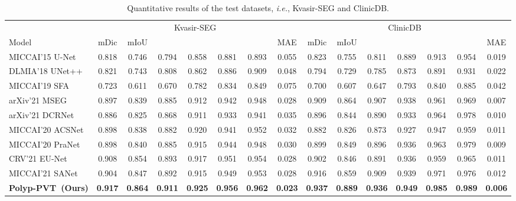 \documentclass[journal]{IEEEtran}
\def\ourmodel{Polyp-PVT}
\begin{document}
\begin{table*}[t!]
\small
\centering
	\caption{Quantitative results of the test datasets, \emph{i.e.}, Kvasir-SEG and ClinicDB.
	}
	\vspace{-5pt}
	\renewcommand{\arraystretch}{1.0}
	\setlength\tabcolsep{4.0pt}
    \begin{tabular}{l|ccccccc|ccccccc}
    \hline  
          & \multicolumn{7}{c|}{Kvasir-SEG~\cite{jha2020kvasir}}                                  & \multicolumn{7}{c}{ClinicDB~\cite{bernal2015wm}} \\
\cline{2-15} 
Model & mDic& mIoU &    &     &    &   & MAE & mDic & mIoU &    &     &  &   & MAE   \\
    \hline
    MICCAI'15 U-Net  & 0.818  & 0.746  & 0.794  & 0.858  & 0.881    & 0.893 & 0.055  & 0.823  & 0.755  & 0.811  & 0.889  & 0.913    & 0.954 & 0.019    \\
    DLMIA'18 UNet++  & 0.821  & 0.743  & 0.808  & 0.862  & 0.886    & 0.909  & 0.048  & 0.794  & 0.729  & 0.785  & 0.873  & 0.891   & 0.931 & 0.022    \\
    MICCAI'19 SFA     & 0.723  & 0.611  & 0.670  & 0.782  & 0.834    & 0.849& 0.075  & 0.700  & 0.607  & 0.647  & 0.793  & 0.840   & 0.885  & 0.042  \\
    arXiv'21 MSEG & 0.897  & 0.839  & 0.885  & 0.912  & 0.942   & 0.948  & 0.028   & 0.909  & 0.864  & 0.907  & 0.938  & 0.961    & 0.969 & 0.007    \\
arXiv'21 DCRNet  & 0.886  & 0.825  & 0.868  & 0.911  & 0.933   & 0.941 & 0.035  & 0.896  & 0.844  & 0.890  & 0.933  & 0.964   & 0.978 & 0.010   \\
    MICCAI'20 ACSNet  & 0.898  & 0.838  & 0.882  & 0.920  & 0.941   & 0.952   & 0.032   & 0.882  & 0.826  & 0.873  & 0.927  & 0.947   & 0.959 & 0.011   \\
    MICCAI'20 PraNet  & 0.898  & 0.840  & 0.885  & 0.915  & 0.944    & 0.948 & 0.030   & 0.899  & 0.849  & 0.896  & 0.936  & 0.963   & 0.979 & 0.009    \\
    CRV'21 EU-Net & 0.908  & 0.854  & 0.893  & 0.917  & 0.951  & 0.954  & 0.028    & 0.902  & 0.846  & 0.891  & 0.936  & 0.959   & 0.965 & 0.011    \\
    MICCAI'21 SANet & 0.904  & 0.847  & 0.892  & 0.915  & 0.949    & 0.953  & 0.028 & 0.916  & 0.859  & 0.909  & 0.939  & 0.971    & 0.976 & 0.012   \\
    \hline
    \rowcolor{gray!30}
    \textbf{\ourmodel~(Ours)} & \textbf{0.917} & \textbf{0.864} & \textbf{0.911} & \textbf{0.925} & \textbf{0.956}  & \textbf{0.962} & \textbf{0.023}  & \textbf{0.937} & \textbf{0.889} & \textbf{0.936} & \textbf{0.949} & \textbf{0.985}  & \textbf{0.989} & \textbf{0.006}\\
    \hline
    \end{tabular}
  \label{tab:test1_1}
\end{table*}
\end{document}
